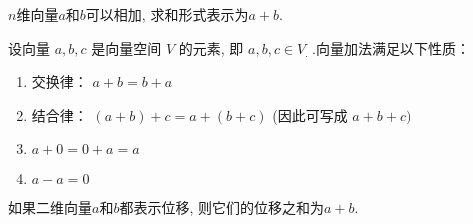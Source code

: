 \begin{definition}[向量加法]
    $n$维向量$a$和$b$可以相加, 求和形式表示为$a + b$.
\end{definition}

\begin{theorem}
    设向量 \( a, {b}, {c} \) 是向量空间 \( V \) 的元素, 即 \( a, {b}, {c} \in V_{\text {.  }} \).向量加法满足以下性质：

    \begin{enumerate}
        \item 交换律： \( a+b=b+a \)
        \item 结合律： \( (a+b)+c=a+(b+c) \) (因此可写成 \( a+{b}+{c}) \)
        \item \( a+0=0+a=a \)
        \item \( a-a=0 \)
    \end{enumerate}
\end{theorem}

\begin{corollary}[向量位移相加]
    如果二维向量$a$和$b$都表示位移, 则它们的位移之和为$a + b$.
\end{corollary}

